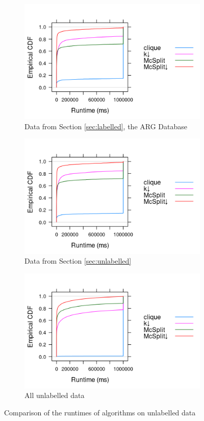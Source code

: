 \documentclass{l4proj}
\theoremstyle{definition}
\theoremstyle{remark}
\begin{document}
\begin{figure}
  \centering
  \begin{subfigure}[t]{0.49\textwidth}
    \centering %
    \includegraphics[scale=0.7]{images/ecdf_sip.png}
    \caption{Data from Section \ref{sec:labelled}, the ARG Database}
    \label{fig:ecdf_unlabelled_mcs}
  \end{subfigure}
  \begin{subfigure}[t]{0.49\textwidth}
    \centering
    \includegraphics[scale=0.7]{images/ecdf_sip.png}
    \caption{Data from Section \ref{sec:unlabelled}}
    \label{fig:ecdf_unlabelled_sip}
  \end{subfigure}
  \begin{subfigure}[t]{\textwidth}
    \centering
    \includegraphics[scale=0.7]{images/ecdf_unlabelled.png}
    \caption{All unlabelled data}
    \label{fig:ecdf_unlabelled_both}
  \end{subfigure}
  \caption{Comparison of the runtimes of algorithms on unlabelled data}
  \label{fig:ecdf_unlabelled}
\end{figure}
\end{document}
